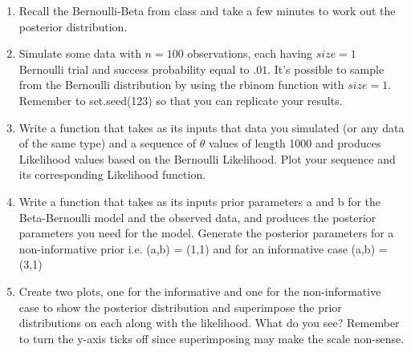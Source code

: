 \documentclass{article}
\begin{document}
\begin{enumerate}
\item Recall the Bernoulli-Beta from class and take a few minutes to work out the posterior distribution. 
\item{Simulate some data with $n = 100$ observations, each having $size=1$ Bernoulli trial and success probability equal to $.01$. It's possible to sample from the Bernoulli distribution by using the \textsf{rbinom} function with $size=1$. Remember to \textsf{set.seed(123)} so that you can replicate your results.}
\item{Write a function that takes as its inputs that data you simulated (or any data of the same type) and a sequence of $\theta$ values of length 1000 and produces Likelihood values based on the Bernoulli Likelihood. Plot your sequence and its corresponding Likelihood function.}
\item{Write a function that takes as its inputs  prior parameters \textsf{a} and \textsf{b} for the Beta-Bernoulli model and the observed data, and produces the posterior parameters you need for the model. Generate the posterior parameters for a non-informative prior i.e. \textsf{(a,b) = (1,1)} and for an informative case \textsf{(a,b) = (3,1)}}
\item{Create two plots, one for the informative and one for the non-informative case to show the posterior distribution and superimpose the prior distributions on each along with the likelihood. What do you see? Remember to turn the y-axis ticks off since superimposing may make the scale non-sense.}
\end{enumerate}
\end{document}
